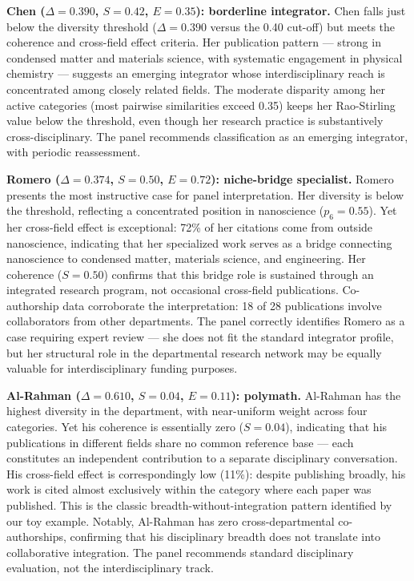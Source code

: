 \documentclass[
]{article}
\begin{document}
\textbf{Chen (\(\Delta = 0.390\), \(S = 0.42\), \(E = 0.35\)):
borderline integrator.} Chen falls just below the diversity threshold
(\(\Delta = 0.390\) versus the 0.40 cut-off) but meets the coherence and
cross-field effect criteria. Her publication pattern --- strong in
condensed matter and materials science, with systematic engagement in
physical chemistry --- suggests an emerging integrator whose
interdisciplinary reach is concentrated among closely related fields.
The moderate disparity among her active categories (most pairwise
similarities exceed 0.35) keeps her Rao-Stirling value below the
threshold, even though her research practice is substantively
cross-disciplinary. The panel recommends classification as an emerging
integrator, with periodic reassessment.

\textbf{Romero (\(\Delta = 0.374\), \(S = 0.50\), \(E = 0.72\)):
niche-bridge specialist.} Romero presents the most instructive case for
panel interpretation. Her diversity is below the threshold, reflecting a
concentrated position in nanoscience (\(p_6 = 0.55\)). Yet her
cross-field effect is exceptional: 72\% of her citations come from
outside nanoscience, indicating that her specialized work serves as a
bridge connecting nanoscience to condensed matter, materials science,
and engineering. Her coherence (\(S = 0.50\)) confirms that this bridge
role is sustained through an integrated research program, not occasional
cross-field publications. Co-authorship data corroborate the
interpretation: 18 of 28 publications involve collaborators from other
departments. The panel correctly identifies Romero as a case requiring
expert review --- she does not fit the standard integrator profile, but
her structural role in the departmental research network may be equally
valuable for interdisciplinary funding purposes.

\textbf{Al-Rahman (\(\Delta = 0.610\), \(S = 0.04\), \(E = 0.11\)):
polymath.} Al-Rahman has the highest diversity in the department, with
near-uniform weight across four categories. Yet his coherence is
essentially zero (\(S = 0.04\)), indicating that his publications in
different fields share no common reference base --- each constitutes an
independent contribution to a separate disciplinary conversation. His
cross-field effect is correspondingly low (11\%): despite publishing
broadly, his work is cited almost exclusively within the category where
each paper was published. This is the classic
breadth-without-integration pattern identified by our toy example.
Notably, Al-Rahman has zero cross-departmental co-authorships,
confirming that his disciplinary breadth does not translate into
collaborative integration. The panel recommends standard disciplinary
evaluation, not the interdisciplinary track.
\end{document}
